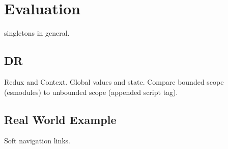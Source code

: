 \chapter{Evaluation}

singletons in general.

\section{DR}
Redux and Context. Global values and state. Compare bounded scope (esmodules) to unbounded scope (appended script tag).

\section{Real World Example}
Soft navigation links.